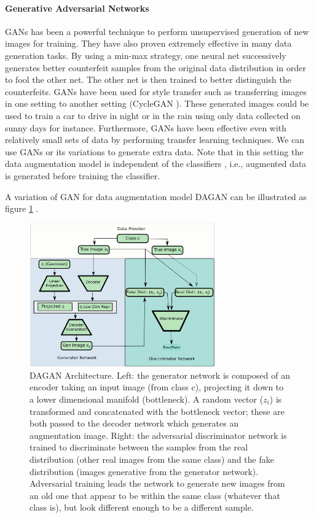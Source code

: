 \documentclass{article}
\begin{document}
\paragraph{Generative Adversarial Networks} GANs \cite{goodfellow2014generative} has been a powerful technique to perform unsupervised generation of new images for training. They have also proven extremely effective in many data generation tasks. By using a min-max strategy, one neural net successively generates better counterfeit samples from the original data distribution in order to fool the other net. The other net is then trained to better distinguish the counterfeits. GANs have been used for style transfer such as transferring images in one setting to another setting (CycleGAN \cite{zhu2017unpaired}). These generated images could be used to train a car to drive in night or in the rain using only data collected on sunny days for instance. Furthermore, GANs have been effective even with relatively small sets of data \cite{gurumurthy2017deligan} by performing transfer learning techniques. We can use GANs or its variations to generate extra data. Note that in this setting the data augmentation model is independent of the classifiers \cite{perez2017effectiveness,antoniou2017data}, i.e., augmented data is generated before training the classifier.

A variation of GAN for data augmentation model DAGAN can be illustrated as figure \ref{fig:dagan} \cite{antoniou2017data}.

\begin{figure}[h]
\label{fig:dagan}
\centering
\includegraphics[width=8cm]{figures/dagan}
\caption{DAGAN Architecture. Left: the generator network is composed of an encoder taking an input image (from class c), projecting it down to a lower dimensional manifold (bottleneck). A random vector ($z_i$) is transformed and concatenated with the bottleneck vector; these are both passed to the decoder network which generates an augmentation image. Right: the adversarial discriminator network is trained to discriminate between the samples from the real distribution (other real images from the same class) and the fake distribution (images generative from the generator network). Adversarial training leads the network to generate new images from an old one that appear to be within the same class (whatever that class is), but look different enough to be a different sample.}
\end{figure}
\end{document}
